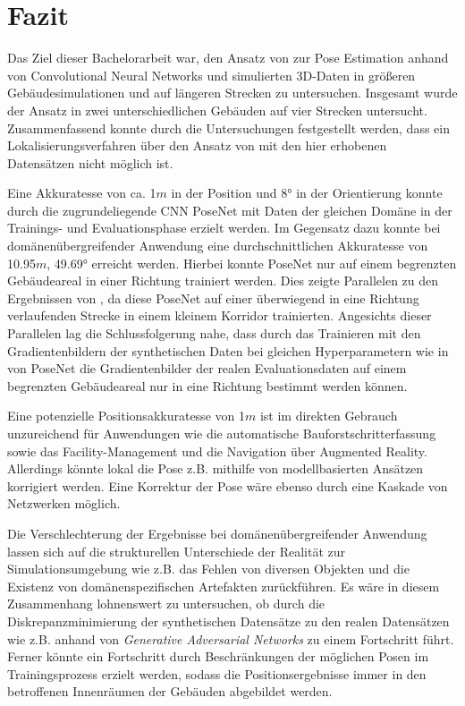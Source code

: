 
\section{Fazit}
\label{sec:kapitel_6}
Das Ziel dieser Bachelorarbeit war, den Ansatz von \citet{acharyaBIMPoseNetIndoorCamera2019} zur Pose Estimation anhand von Convolutional Neural Networks und simulierten 3D-Daten in größeren Gebäudesimulationen und auf längeren Strecken zu untersuchen.
Insgesamt wurde der Ansatz in zwei unterschiedlichen Gebäuden auf vier Strecken untersucht. Zusammenfassend konnte durch die Untersuchungen festgestellt werden, dass ein Lokalisierungsverfahren über den Ansatz von \citet{acharyaBIMPoseNetIndoorCamera2019} mit den hier erhobenen Datensätzen nicht möglich ist.


Eine Akkuratesse von ca. 1$m$ in der Position und 8° in der Orientierung konnte durch die zugrundeliegende CNN PoseNet mit Daten der gleichen Domäne in der Trainings- und Evaluationsphase erzielt werden. Im Gegensatz dazu konnte bei domänenübergreifender Anwendung eine durchschnittlichen Akkuratesse von 10.95$m$, 49.69° erreicht werden. Hierbei konnte PoseNet nur auf einem begrenzten Gebäudeareal in einer Richtung trainiert werden. Dies zeigte Parallelen zu den Ergebnissen von \citet{acharyaBIMPoseNetIndoorCamera2019}, da diese PoseNet auf einer überwiegend in eine Richtung verlaufenden Strecke in einem kleinem Korridor trainierten. Angesichts dieser Parallelen lag die Schlussfolgerung nahe, dass durch das Trainieren mit den Gradientenbildern der synthetischen Daten bei gleichen Hyperparametern wie in \cite{acharyaBIMPoseNetIndoorCamera2019} von PoseNet die Gradientenbilder der realen Evaluationsdaten auf einem begrenzten Gebäudeareal nur in eine Richtung bestimmt werden können.

Eine potenzielle Positionsakkuratesse von 1$m$ ist im direkten Gebrauch unzureichend für Anwendungen wie die automatische Bauforstschritterfassung sowie das Facility-Manage\-ment und die Navigation über Augmented Reality. Allerdings könnte lokal die Pose z.B. mithilfe von modellbasierten Ansätzen korrigiert werden. Eine Korrektur der Pose wäre ebenso durch eine Kaskade von Netzwerken möglich.

Die Verschlechterung der Ergebnisse bei domänenübergreifender Anwendung lassen sich auf die strukturellen Unterschiede der Realität zur Simulationsumgebung wie z.B. das Fehlen von diversen Objekten und die Existenz von domänenspezifischen Artefakten zurückführen. Es wäre in diesem Zusammenhang lohnenswert zu untersuchen, ob durch die Diskrepanzminimierung der synthetischen Datensätze zu den realen Datensätzen wie z.B. anhand von \textit{Generative Adversarial Networks} zu einem Fortschritt führt. Ferner könnte ein Fortschritt durch Beschränkungen der möglichen Posen im Trainingsprozess erzielt werden, sodass die Positionsergebnisse immer in den betroffenen Innenräumen der Gebäuden abgebildet werden.
